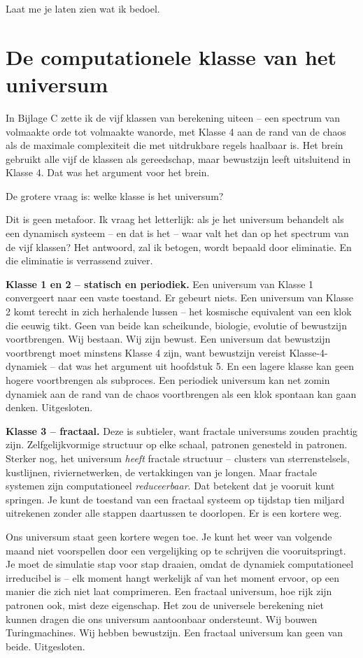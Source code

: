 \documentclass[11pt, twoside, openright]{book}
\begin{document}
Laat me je laten zien wat ik bedoel.


\section*{De computationele klasse van het universum}

In Bijlage C zette ik de vijf klassen van berekening uiteen -- een spectrum van volmaakte orde tot volmaakte wanorde, met Klasse 4 aan de rand van de chaos als de maximale complexiteit die met uitdrukbare regels haalbaar is. Het brein gebruikt alle vijf de klassen als gereedschap, maar bewustzijn leeft uitsluitend in Klasse 4. Dat was het argument voor het brein.

De grotere vraag is: welke klasse is het universum?

Dit is geen metafoor. Ik vraag het letterlijk: als je het universum behandelt als een dynamisch systeem -- en dat is het -- waar valt het dan op het spectrum van de vijf klassen? Het antwoord, zal ik betogen, wordt bepaald door eliminatie. En die eliminatie is verrassend zuiver.

\textbf{Klasse 1 en 2 -- statisch en periodiek.} Een universum van Klasse 1 convergeert naar een vaste toestand. Er gebeurt niets. Een universum van Klasse 2 komt terecht in zich herhalende lussen -- het kosmische equivalent van een klok die eeuwig tikt. Geen van beide kan scheikunde, biologie, evolutie of bewustzijn voortbrengen. Wij bestaan. Wij zijn bewust. Een universum dat bewustzijn voortbrengt moet minstens Klasse 4 zijn, want bewustzijn vereist Klasse-4-dynamiek -- dat was het argument uit hoofdstuk 5. En een lagere klasse kan geen hogere voortbrengen als subproces. Een periodiek universum kan net zomin dynamiek aan de rand van de chaos voortbrengen als een klok spontaan kan gaan denken. Uitgesloten.

\textbf{Klasse 3 -- fractaal.} Deze is subtieler, want fractale universums zouden prachtig zijn. Zelfgelijkvormige structuur op elke schaal, patronen genesteld in patronen. Sterker nog, het universum \textit{heeft} fractale structuur -- clusters van sterrenstelsels, kustlijnen, riviernetwerken, de vertakkingen van je longen. Maar fractale systemen zijn computationeel \textit{reduceerbaar}. Dat betekent dat je vooruit kunt springen. Je kunt de toestand van een fractaal systeem op tijdstap tien miljard uitrekenen zonder alle stappen daartussen te doorlopen. Er is een kortere weg.

Ons universum staat geen kortere wegen toe. Je kunt het weer van volgende maand niet voorspellen door een vergelijking op te schrijven die vooruitspringt. Je moet de simulatie stap voor stap draaien, omdat de dynamiek computationeel irreducibel is -- elk moment hangt werkelijk af van het moment ervoor, op een manier die zich niet laat comprimeren. Een fractaal universum, hoe rijk zijn patronen ook, mist deze eigenschap. Het zou de universele berekening niet kunnen dragen die ons universum aantoonbaar ondersteunt. Wij bouwen Turingmachines. Wij hebben bewustzijn. Een fractaal universum kan geen van beide. Uitgesloten.
\end{document}
